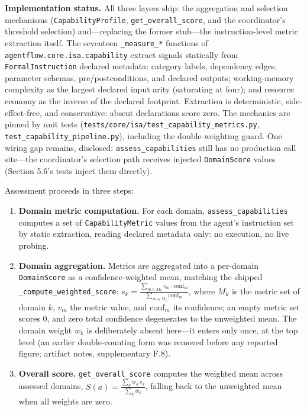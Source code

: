 \documentclass[
  sigconf,
  anonymous]{acmart}
\begin{document}
\textbf{Implementation status.} All three layers ship: the aggregation
and selection mechanisms (\texttt{CapabilityProfile},
\texttt{get\_overall\_score}, and the coordinator's threshold selection)
and---replacing the former stub---the instruction-level metric
extraction itself. The seventeen \texttt{\_measure\_*} functions of
\texttt{agentflow.core.isa.capability} extract signals statically from
\texttt{FormalInstruction} declared metadata: category labels,
dependency edges, parameter schemas, pre/postconditions, and declared
outputs; working-memory complexity as the largest declared input arity
(saturating at four); and resource economy as the inverse of the
declared footprint. Extraction is deterministic, side-effect-free, and
conservative: absent declarations score zero. The mechanics are pinned
by unit tests (\texttt{tests/core/isa/test\_capability\_metrics.py},
\texttt{test\_capability\_pipeline.py}), including the double-weighting
guard. One wiring gap remains, disclosed: \texttt{assess\_capabilities}
still has no production call site---the coordinator's selection path
receives injected \texttt{DomainScore} values (Section 5.6's tests
inject them directly).

Assessment proceeds in three steps:

\begin{enumerate}
\def\labelenumi{\arabic{enumi}.}
\item
  \textbf{Domain metric computation.} For each domain,
  \texttt{assess\_capabilities} computes a set of
  \texttt{CapabilityMetric} values from the agent's instruction set by
  static extraction, reading declared metadata only: no execution, no
  live probing.
\item
  \textbf{Domain aggregation.} Metrics are aggregated into a per-domain
  \texttt{DomainScore} as a confidence-weighted mean, matching the
  shipped \texttt{\_compute\_weighted\_score}:
  \(s_k = \frac{\sum_{m \in M_k} v_m \cdot \text{conf}_m}{\sum_{m \in M_k} \text{conf}_m}\),
  where \(M_k\) is the metric set of domain \(k\), \(v_m\) the metric
  value, and \(\text{conf}_m\) its confidence; an empty metric set
  scores \(0\), and zero total confidence degenerates to the unweighted
  mean. The domain weight \(w_k\) is deliberately absent here---it
  enters only once, at the top level (an earlier double-counting form
  was removed before any reported figure; artifact notes, supplementary
  F.8).
\item
  \textbf{Overall score.} \texttt{get\_overall\_score} computes the
  weighted mean across assessed domains,
  \(S(a) = \frac{\sum_{k} w_k \, s_k}{\sum_{k} w_k}\), falling back to
  the unweighted mean when all weights are zero.
\end{enumerate}
\end{document}
